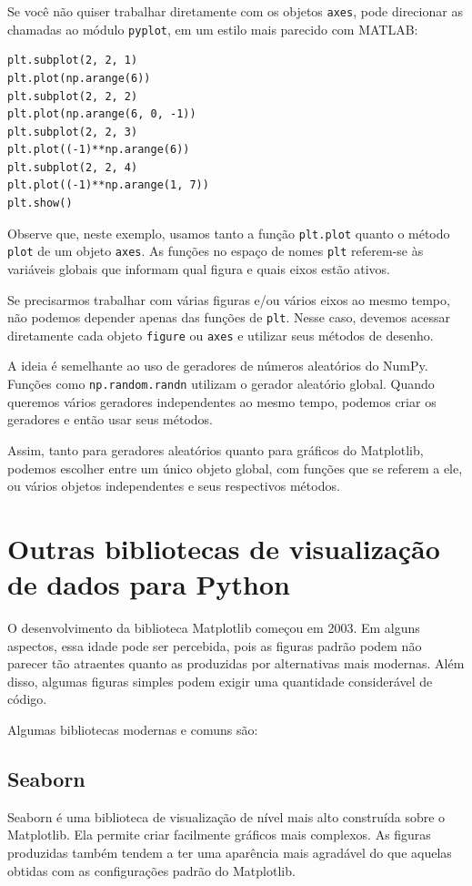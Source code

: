 \documentclass[11pt,a4paper]{article}
\begin{document}
Se você não quiser trabalhar diretamente com os objetos \texttt{axes}, pode direcionar as chamadas ao módulo \texttt{pyplot}, em um estilo mais parecido com MATLAB:

\begin{lstlisting}
plt.subplot(2, 2, 1)
plt.plot(np.arange(6))
plt.subplot(2, 2, 2)
plt.plot(np.arange(6, 0, -1))
plt.subplot(2, 2, 3)
plt.plot((-1)**np.arange(6))
plt.subplot(2, 2, 4)
plt.plot((-1)**np.arange(1, 7))
plt.show()
\end{lstlisting}

Observe que, neste exemplo, usamos tanto a função \texttt{plt.plot} quanto o método \texttt{plot} de um objeto \texttt{axes}. As funções no espaço de nomes \texttt{plt} referem-se às variáveis globais que informam qual figura e quais eixos estão ativos.

Se precisarmos trabalhar com várias figuras e/ou vários eixos ao mesmo tempo, não podemos depender apenas das funções de \texttt{plt}. Nesse caso, devemos acessar diretamente cada objeto \texttt{figure} ou \texttt{axes} e utilizar seus métodos de desenho.

A ideia é semelhante ao uso de geradores de números aleatórios do NumPy. Funções como \texttt{np.random.randn} utilizam o gerador aleatório global. Quando queremos vários geradores independentes ao mesmo tempo, podemos criar os geradores e então usar seus métodos.

Assim, tanto para geradores aleatórios quanto para gráficos do Matplotlib, podemos escolher entre um único objeto global, com funções que se referem a ele, ou vários objetos independentes e seus respectivos métodos.

\section{Outras bibliotecas de visualização de dados para Python}

O desenvolvimento da biblioteca Matplotlib começou em 2003. Em alguns aspectos, essa idade pode ser percebida, pois as figuras padrão podem não parecer tão atraentes quanto as produzidas por alternativas mais modernas. Além disso, algumas figuras simples podem exigir uma quantidade considerável de código.

Algumas bibliotecas modernas e comuns são:

\subsection{Seaborn}
Seaborn é uma biblioteca de visualização de nível mais alto construída sobre o Matplotlib. Ela permite criar facilmente gráficos mais complexos. As figuras produzidas também tendem a ter uma aparência mais agradável do que aquelas obtidas com as configurações padrão do Matplotlib.
\end{document}
